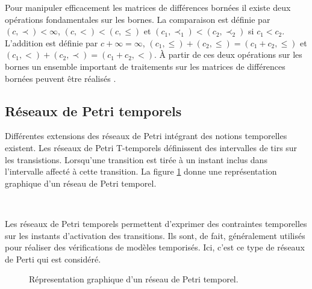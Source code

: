 \documentclass{article}
\begin{document}
          Pour manipuler efficacement les matrices de différences bornées il
          existe deux opérations fondamentales sur les bornes. La comparaison
          est définie par $(c, \prec) < \infty$, $(c, <) < (c, \leq)$ et $(c_1,
          \prec_1) < (c_2, \prec_2)$ si $c_1 < c_2$. L'addition est définie par
          $c + \infty = \infty$, $(c_1, \leq) + (c_2, \leq) = (c_1 + c_2, \leq)$
          et $(c_1, <) + (c_2, \prec) = (c_1 + c_2, <)$. À partir de ces deux
          opérations sur les bornes un ensemble important de traitements sur les
          matrices de différences bornées peuvent être réalisés
          \cite{bengtsson02}.
          
    \subsection{Réseaux de Petri temporels}


      Différentes extensions des réseaux de Petri intégrant des notions
      temporelles existent. Les réseaux de Petri T-temporels \cite{merlin74}
      définissent des intervalles de tirs sur les transistions. Lorsqu'une
      transition est tirée à un instant inclus dans l'intervalle affecté à cette
      transition. La figure \ref{fig:petri-temporel} donne une représentation
      graphique d'un réseau de Petri temporel.
      
      ~

      Les réseaux de Petri temporels permettent d'exprimer des contraintes
      temporelles sur les instants d'activation des transitions. Ils sont, de
      fait, généralement utilisés pour réaliser des vérifications de modèles
      temporisés. Ici, c'est ce type de réseaux de Perti qui est considéré.
      
      \begin{figure}
        \centering \small
        \caption{Répresentation graphique d'un réseau de Petri temporel.}
        \label{fig:petri-temporel}
      \end{figure}
      
\end{document}
